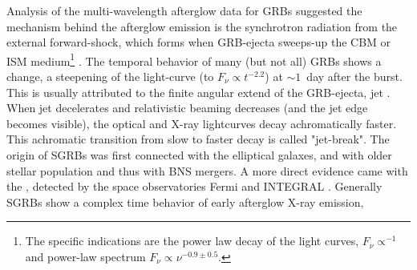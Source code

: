 %
Analysis of the multi-wavelength afterglow data for \acp{GRB} \citep[\eg][]{Panaitescu:2001bx} 
suggested the mechanism behind the afterglow emission is the synchrotron radiation from the 
external forward-shock, which forms when \ac{GRB}-ejecta sweeps-up the \ac{CBM} or \ac{ISM}
medium\footnote{
    The specific indications are the power law decay of the light curves, 
    $F_{\nu}\propto^{-1}$ and power-law spectrum $F_{\nu}\propto\nu^{-0.9\pm 0.5}$.
} 
\citep{Rees:1992ek,Paczynski:1993gz,Meszaros:1993ju,Meszaros:1996sv}.
%
The temporal behavior of many (but not all) \acp{GRB} shows a change, a steepening 
of the light-curve (to $F_{\nu}\propto t^{-2.2}$) at $\sim 1$~day after the burst. 
This is usually attributed to the 
finite angular extend of the \ac{GRB}-ejecta, jet \citep[\eg][]{Rhoads:1999wm,Sari:1999mr}. 
When jet decelerates and relativistic beaming decreases (and the jet edge becomes visible), 
the optical and X-ray lightcurves decay achromatically faster. This achromatic transition 
from slow to faster decay is called "jet-break".
%
%
The origin of \acp{SGRB} was first connected with the elliptical galaxes, and with 
older stellar population 
\citep[\eg][]{Gehrels:2005qk,Fox:2005kv,Barthelmy:2005bx,Berger:2005dr,Panaitescu:2005er,Bloom:2005qx,Guetta:2005bb,Nakar:2007yr} 
and thus with \ac{BNS} mergers. A more direct evidence came with the \GRB{}
\citep{Savchenko:2017ffs,Alexander:2017aly,Troja:2017nqp,Monitor:2017mdv,Nynka:2018vup,Hajela:2019mjy}, 
detected by the space observatories Fermi \citep{TheFermi-LAT:2015kwa} and INTEGRAL \citep{Winkler:2011}.
%
Generally \acp{SGRB} show a complex time behavior of early afterglow X-ray emission, 
